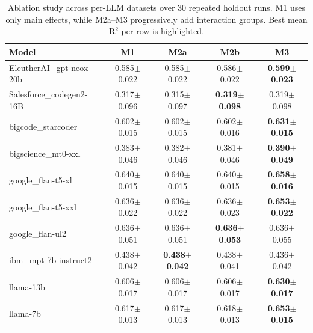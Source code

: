 \begin{table}[t]
\centering
\small
\caption{Ablation study across per-LLM datasets over 30 repeated holdout runs. M1 uses only main effects, while M2a--M3 progressively add interaction groups. Best mean R$^2$ per row is highlighted.}
\label{tab:ablation_r2}
\begin{tabular}{lcccc}
\toprule
Model & M1 & M2a & M2b & M3 \\
\midrule
EleutherAI\_gpt-neox-20b & 0.585$\pm$0.022 & 0.585$\pm$0.022 & 0.586$\pm$0.022 & \textbf{0.599$\pm$0.023} \\
Salesforce\_codegen2-16B & 0.317$\pm$0.096 & 0.315$\pm$0.097 & \textbf{0.319$\pm$0.098} & 0.319$\pm$0.098 \\
bigcode\_starcoder & 0.602$\pm$0.015 & 0.602$\pm$0.015 & 0.602$\pm$0.016 & \textbf{0.631$\pm$0.015} \\
bigscience\_mt0-xxl & 0.383$\pm$0.046 & 0.382$\pm$0.046 & 0.381$\pm$0.046 & \textbf{0.390$\pm$0.049} \\
google\_flan-t5-xl & 0.640$\pm$0.015 & 0.640$\pm$0.015 & 0.640$\pm$0.015 & \textbf{0.658$\pm$0.016} \\
google\_flan-t5-xxl & 0.636$\pm$0.022 & 0.636$\pm$0.022 & 0.636$\pm$0.023 & \textbf{0.653$\pm$0.022} \\
google\_flan-ul2 & 0.636$\pm$0.051 & 0.636$\pm$0.051 & \textbf{0.636$\pm$0.053} & 0.636$\pm$0.055 \\
ibm\_mpt-7b-instruct2 & 0.438$\pm$0.042 & \textbf{0.438$\pm$0.042} & 0.438$\pm$0.041 & 0.436$\pm$0.042 \\
llama-13b & 0.606$\pm$0.017 & 0.606$\pm$0.017 & 0.606$\pm$0.017 & \textbf{0.630$\pm$0.017} \\
llama-7b & 0.617$\pm$0.013 & 0.617$\pm$0.013 & 0.618$\pm$0.013 & \textbf{0.653$\pm$0.015} \\
\bottomrule
\end{tabular}
\end{table}